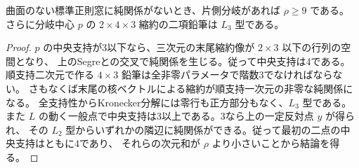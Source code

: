 \begin{corollary}\label{cor:pure-free-branch-rank-nine}
曲面のない標準正則窓に純関係がないとき、片側分岐があれば $\rho\ge9$ である。
さらに分岐中心 $p$ の $2\times4\times3$ 縮約の二項鉛筆は $L_3$ 型である。
\end{corollary}
\begin{proof}
$p$ の中央支持が3以下なら、三次元の末尾縮約像が $2\times3$ 以下の行列の空間となり、
上のSegreとの交叉で純関係を生じる。従って中央支持は4である。
順支持二次元で作る $4\times3$ 鉛筆は全非零パラメータで階数3でなければならない。
さもなくば末尾の核ベクトルによる縮約が順支持一次元の非零な純関係になる。
全支持性からKronecker分解には零行も正方部分もなく、$L_3$ 型である。
また $L$ の動く一般点で中央支持は3以上である。3なら上の一定反対点 $y$ が得られ、
その $L_2$ 型からいずれかの隣辺に純関係ができる。従って最初の二点の中央支持はともに4であり、
それらの次元和が $\rho$ より小さいことから結論を得る。
\end{proof}
